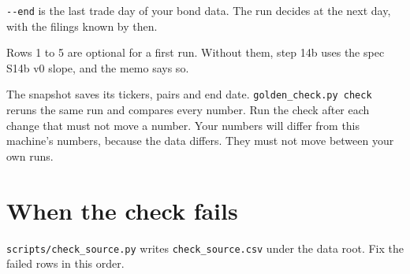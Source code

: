 \documentclass[10.5pt,a4paper]{article}
\newcommand{\code}[1]{\texttt{\small #1}}
\begin{document}
\code{-{}-end} is the last trade day of your bond data. The run decides at the next day, with the filings known by then.

Rows 1 to 5 are optional for a first run. Without them, step 14b uses the spec S14b v0 slope, and the memo says so.

The snapshot saves its tickers, pairs and end date. \code{golden\_\allowbreak{}check.py check} reruns the same run and compares every number. Run the check after each change that must not move a number. Your numbers will differ from this machine's numbers, because the data differs. They must not move between your own runs.

\section{When the check fails}

\code{scripts/\allowbreak{}check\_\allowbreak{}source.py} writes \code{check\_\allowbreak{}source.csv} under the data root. Fix the failed rows in this order.
\end{document}
